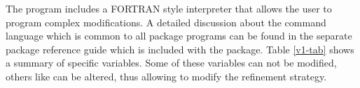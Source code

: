 The program includes a FORTRAN style interpreter that allows the
user to program complex modifications. A detailed discussion about the 
command language which is common to all \Discus package programs can be 
found in the separate \Discus package reference guide which is included with 
the package. Table \ref{v1-tab} shows a summary of \Diffev specific 
variables. Some of these variables can not be modified, others like can be 
altered, thus allowing to modify the refinement strategy.
